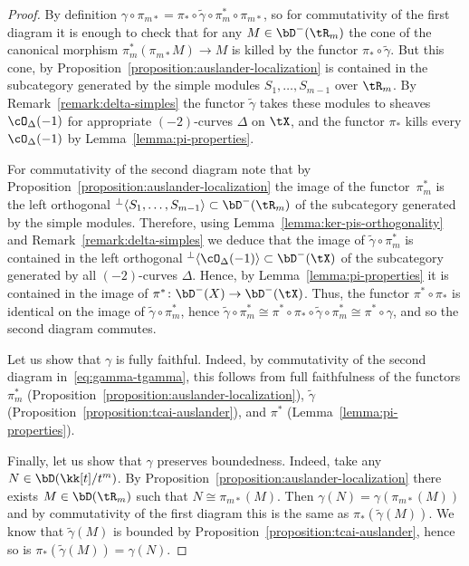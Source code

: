 \documentclass[11pt]{amsart}
\theoremstyle{plain}
\theoremstyle{definition}
\theoremstyle{remark}
\begin{document}
\begin{proof}
By definition $\gamma \circ \pi_{m*} = \pi_* \circ \tilde\gamma \circ \pi_m^* \circ \pi_{m*}$, so for commutativity of the first diagram it is enough to check that for any $M \in \bD^-(\tR_m)$ 
the cone of the canonical morphism $\pi_m^*(\pi_{m*}M) \to M$ is killed by the functor $\pi_* \circ \tilde\gamma$.
But this cone, by Proposition~\ref{proposition:auslander-localization} is contained in the subcategory generated by the simple modules $S_1,\dots,S_{m-1}$ over $\tR_m$.
By Remark~\ref{remark:delta-simples} the functor $\tilde\gamma$ takes these modules to sheaves $\cO_\Delta(-1)$ 
for appropriate $(-2)$-curves $\Delta$ on $\tX$, and the functor $\pi_*$ kills every $\cO_\Delta(-1)$ by Lemma~\ref{lemma:pi-properties}.

For commutativity of the second diagram note that by Proposition~\ref{proposition:auslander-localization} the image of the functor~$\pi_m^*$ 
is the left orthogonal ${}^\perp\langle S_1,\dots, S_{m-1} \rangle \subset \bD^-(\tR_m)$ of the subcategory generated by the simple modules.
Therefore, using Lemma~\ref{lemma:ker-pis-orthogonality} and Remark~\ref{remark:delta-simples} we deduce that the image of $\tilde\gamma \circ \pi_m^*$ is contained 
in the left orthogonal ${}^\perp \langle \cO_\Delta(-1) \rangle \subset \bD^-(\tX)$ of the subcategory generated by all $(-2)$-curves $\Delta$.
Hence, by Lemma~\ref{lemma:pi-properties} it is contained in the image of $\pi^* \colon \bD^-(X) \to \bD^-(\tX)$.
Thus, the functor $\pi^* \circ \pi_*$ is identical on the image of $\tilde\gamma \circ \pi_m^*$, hence 
$\tilde\gamma \circ \pi_m^* \cong 
\pi^* \circ \pi_* \circ \tilde\gamma \circ \pi_m^* \cong 
\pi^* \circ \gamma$,
and so the second diagram commutes.

Let us show that $\gamma$ is fully faithful.
Indeed, by commutativity of the second diagram in~\eqref{eq:gamma-tgamma}, this follows from full faithfulness of the functors $\pi_m^*$ (Proposition~\ref{proposition:auslander-localization}), 
$\tilde\gamma$ (Proposition~\ref{proposition:tcai-auslander}), and $\pi^*$ (Lemma~\ref{lemma:pi-properties}).


Finally, let us show that $\gamma$ preserves boundedness.
Indeed, take any $N \in \bD(\kk[t]/t^m)$.
By Proposition~\ref{proposition:auslander-localization} there exists $M \in \bD(\tR_m)$ such that $N \cong \pi_{m*}(M)$.
Then $\gamma(N) = \gamma(\pi_{m*}(M))$ and by commutativity of the first diagram this is the same as $\pi_*(\tilde\gamma(M))$.
We know that $\tilde\gamma(M)$ is bounded by Proposition~\ref{proposition:tcai-auslander}, hence so is $\pi_*(\tilde\gamma(M)) = \gamma(N)$.
\end{proof}
\end{document}
